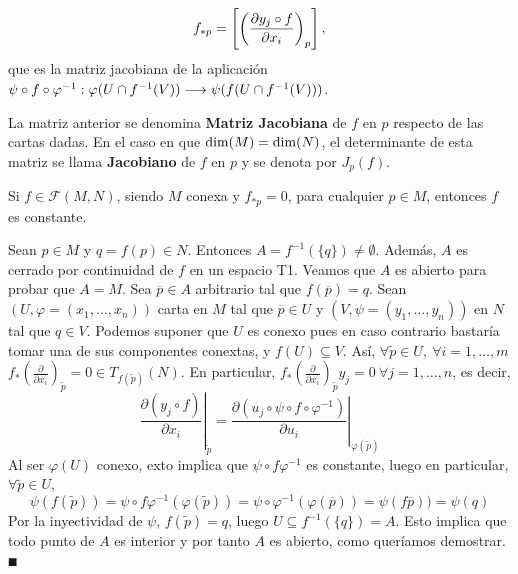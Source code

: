 \documentclass[Cursovd_portada.tex]{subfiles}
\begin{document}
$$f_{*p}=\left[\left(\displaystyle{\frac{\partial y_j\circ f}{\partial x_i}}\right)_p\right],$$
que es la matriz jacobiana de la aplicación $\psi\circ f\circ\varphi^{-1}:\varphi(U\cap f^{-1}(V))\longrightarrow\psi(f(U\cap
f^{-1}(V)))$.
\begin{defi}
La matriz anterior se denomina {\bf Matriz Jacobiana} de $f$ en $p$ respecto de las cartas dadas. En el caso en
que ${\rm dim}(M)={\rm dim}(N)$, el determinante de esta matriz se llama {\bf Jacobiano} de $f$ en $p$ y se denota
por $J_p(f)$.
\end{defi}
\begin{prop} Si $f\in\mathcal{F}(M,N)$, siendo $M$ conexa y $f_{*p}=0$, para cual\-quier $p\in M$, entonces $f$
es constante.
\end{prop}
\begin{dem}
Sean $p\in M$ y $q=f(p)\in N$. Entonces $A=f^{-1}(\{q\})\neq\emptyset$. Además, $A$ es cerrado por continuidad de $f$ en un espacio T1. Veamos que $A$ es abierto para probar que $A=M$. Sea $\overline{p}\in A$ arbitrario tal que $f(\overline{p})=q$. Sean $(U,\varphi=(x_1,\dots,x_n))$ carta en $M$ tal que $\overline{p}\in U$ y $(V,\psi=(y_1,\dots,y_n))$ en $N$ tal que $q\in V$. Podemos suponer que $U$ es conexo pues en caso contrario bastaría tomar una de sus componentes conextas, y $f(U)\subseteq V$. Así, $\forall \tilde{p}\in U,\ \forall i=1,\dots, m$ $f_*\left(\frac{\partial}{\partial x_i}\right)_{\tilde{p}}=0\in T_{f(\tilde{p})}(N)$. En particular, $f_*\left(\frac{\partial}{\partial x_i}\right)_{\tilde{p}}y_j=0\ \forall j=1,\dots, n$, es decir, 
$$\left.\frac{\partial(y_j\circ f)}{\partial x_i}\right|_{\tilde{p}}=\left.\frac{\partial(u_j\circ\psi\circ f\circ\varphi^{-1})}{\partial u_i}\right|_{\varphi(\tilde{p})}$$
Al ser $\varphi(U)$ conexo, exto implica que $\psi\circ f\varphi^{-1}$ es constante, luego en particular, $\forall \tilde{p}\in U$, 
$$\psi(f(\tilde{p}))=\psi\circ f\varphi^{-1}(\varphi(\tilde{p}))=\psi\circ\varphi^{-1}(\varphi(\overline{p}))=\psi(f\overline{p}))=\psi(q)$$
Por la inyectividad de $\psi$, $f(\tilde{p})=q$, luego $U\subseteq f^{-1}(\{q\})=A$. Esto implica que todo punto de $A$ es interior y por tanto $A$ es abierto, como queríamos demostrar. $\QED$
\end{dem}
\end{document}
